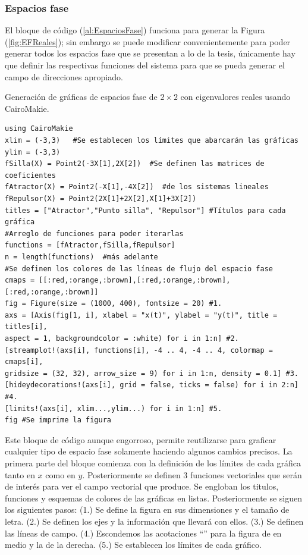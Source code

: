 \subsubsection{Espacios fase}
El bloque de código (\ref{al:EspaciosFase}) funciona para generar la Figura (\ref{fig:EFReales}); sin embargo se puede modificar convenientemente para poder generar todos los espacios fase que se presentan a lo de la tesis, únicamente hay que definir las respectivas funciones del sistema para que se pueda generar el campo de direcciones apropiado.
\begin{algorithm}
	\caption{Generación de gráficas de espacios fase de $2\times 2$ con eigenvalores reales usando CairoMakie.}
	\label{al:EspaciosFase}
	\begin{verbatim}
using CairoMakie
xlim = (-3,3)	#Se establecen los límites que abarcarán las gráficas
ylim = (-3,3)
fSilla(X) = Point2(-3X[1],2X[2])  #Se definen las matrices de coeficientes
fAtractor(X) = Point2(-X[1],-4X[2])  #de los sistemas lineales
fRepulsor(X) = Point2(2X[1]+2X[2],X[1]+3X[2])
titles = ["Atractor","Punto silla", "Repulsor"] #Títulos para cada gráfica
#Arreglo de funciones para poder iterarlas
functions = [fAtractor,fSilla,fRepulsor]
n = length(functions)  #más adelante
#Se definen los colores de las líneas de flujo del espacio fase
cmaps = [[:red,:orange,:brown],[:red,:orange,:brown],[:red,:orange,:brown]]
fig = Figure(size = (1000, 400), fontsize = 20) #1.
axs = [Axis(fig[1, i], xlabel = "x(t)", ylabel = "y(t)", title = titles[i], 
aspect = 1, backgroundcolor = :white) for i in 1:n] #2.
[streamplot!(axs[i], functions[i], -4 .. 4, -4 .. 4, colormap = cmaps[i],
gridsize = (32, 32), arrow_size = 9) for i in 1:n, density = 0.1] #3.
[hideydecorations!(axs[i], grid = false, ticks = false) for i in 2:n] #4.
[limits!(axs[i], xlim...,ylim...) for i in 1:n] #5.
fig	#Se imprime la figura
	\end{verbatim}
\end{algorithm}

\setlength{\parindent}{0cm}Este bloque de código aunque engorroso, permite reutilizarse para graficar cualquier tipo de espacio fase solamente haciendo algunos cambios precisos. La primera parte del bloque comienza con la definición de los límites de cada gráfica tanto en $x$ como en $y$. Posteriormente se definen 3 funciones vectoriales que serán de interés para ver el campo vectorial que produce. Se engloban los titulos, funciones y esquemas de colores de las gráficas en listas. Posteriormente se siguen los siguientes pasos: (1.) Se define la figura en sus dimensiones y el tamaño de letra. (2.) Se definen los ejes y la información que llevará con ellos. (3.) Se definen las líneas de campo. (4.) Escondemos las acotaciones ``'' para la figura de en medio y la de la derecha. (5.) Se establecen los límites de cada gráfico.


